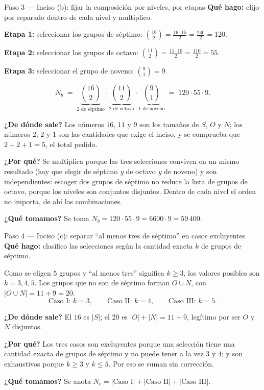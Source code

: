 \documentclass[11pt]{article}
\begin{document}
\begin{paso}{Paso 3 --- Inciso (b): fijar la composición por niveles, por etapas}
\textbf{Qué hago:} elijo por separado dentro de cada nivel y multiplico.

\medskip
\textbf{Etapa 1:} seleccionar los grupos de séptimo: $\displaystyle\binom{16}{2}=\frac{16\cdot 15}{2}=\frac{240}{2}=120$.

\textbf{Etapa 2:} seleccionar los grupos de octavo: $\displaystyle\binom{11}{2}=\frac{11\cdot 10}{2}=\frac{110}{2}=55$.

\textbf{Etapa 3:} seleccionar el grupo de noveno: $\displaystyle\binom{9}{1}=9$.

\medskip
\[
  N_b \;=\; \underbrace{\binom{16}{2}}_{\text{2 de séptimo}}\cdot \underbrace{\binom{11}{2}}_{\text{2 de octavo}}\cdot \underbrace{\binom{9}{1}}_{\text{1 de noveno}} \;=\; 120\cdot 55\cdot 9 .
\]

\textbf{¿De dónde sale?} Los números $16$, $11$ y $9$ son los tamaños de $S$, $O$ y $N$; los números $2$, $2$ y $1$ son las cantidades que exige el inciso, y se comprueba que $2+2+1=5$, el total pedido.

\textbf{¿Por qué?} Se multiplica porque las tres selecciones conviven en un mismo resultado (hay que elegir de séptimo \emph{y} de octavo \emph{y} de noveno) y son independientes: escoger dos grupos de séptimo no reduce la lista de grupos de octavo, porque los niveles son conjuntos disjuntos. Dentro de cada nivel el orden no importa, de ahí las combinaciones.

\textbf{¿Qué tomamos?} Se toma $N_b = 120\cdot 55\cdot 9 = 6600\cdot 9 = 59\,400$.
\end{paso}

\begin{paso}{Paso 4 --- Inciso (c): separar ``al menos tres de séptimo'' en casos excluyentes}
\textbf{Qué hago:} clasifico las selecciones según la cantidad exacta $k$ de grupos de séptimo.

Como se eligen $5$ grupos y ``al menos tres'' significa $k\ge 3$, los valores posibles son $k=3,4,5$. Los grupos que no son de séptimo forman $O\cup N$, con $|O\cup N| = 11+9 = 20$.
\[
  \text{Caso I: } k=3,\qquad \text{Caso II: } k=4,\qquad \text{Caso III: } k=5 .
\]

\textbf{¿De dónde sale?} El $16$ es $|S|$; el $20$ es $|O|+|N|=11+9$, legítimo por ser $O$ y $N$ disjuntos.

\textbf{¿Por qué?} Los tres casos son excluyentes porque una selección tiene una cantidad exacta de grupos de séptimo y no puede tener a la vez $3$ y $4$; y son exhaustivos porque $k\ge 3$ y $k\le 5$. Por eso se suman sin corrección.

\textbf{¿Qué tomamos?} Se anota $N_c = |\text{Caso I}|+|\text{Caso II}|+|\text{Caso III}|$.
\end{paso}
\end{document}
